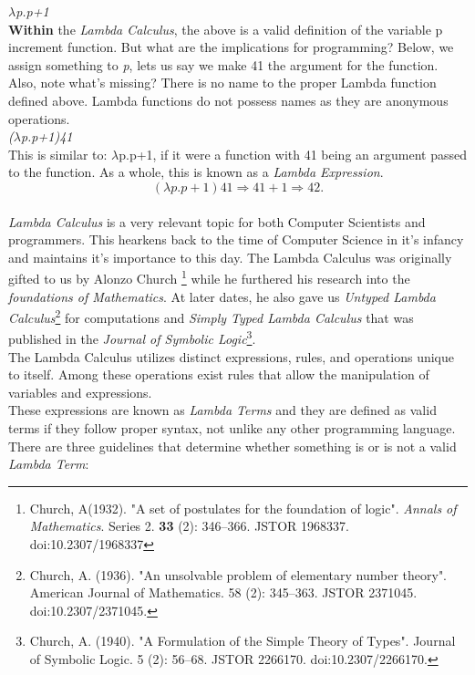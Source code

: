\documentclass[oneside,12pt]{memoir} %
\begin{document}
	
\emph{\ensuremath{\lambda}p.p+1}\\

\textbf{Within} the \emph{Lambda Calculus}, the above is a valid definition of the variable p increment function. But what are the implications for programming? Below, we assign something to \emph{p}, lets us say we make 41 the argument for the function. Also, note what's missing? There is no name to the proper Lambda function defined above. Lambda functions do not possess names as they are anonymous operations.\\


\emph{(\ensuremath{\lambda}p.p+1)41}\\

This is similar to: \ensuremath{\lambda}p.p+1, if it were a function with 41 being an argument passed to the function. As a whole, this is known as a \emph{Lambda Expression}.\\

\[(\lambda p.p+1)41 \Rightarrow 41+1 \Rightarrow 42.\]\\



\emph{Lambda Calculus} is a very relevant topic for both Computer Scientists and programmers. This hearkens back to the time of Computer Science in it's infancy and maintains it's importance to this day. The Lambda Calculus was originally gifted to us by Alonzo Church \footnote{Church, A(1932). "A set of postulates for the foundation of logic". \emph{Annals of Mathematics}. Series 2. \textbf{33} (2): 346–366. JSTOR 1968337. doi:10.2307/1968337} while he furthered his research into the \emph{foundations of Mathematics}. At later dates, he also gave us \emph{Untyped Lambda Calculus}\footnote{ Church, A. (1936). "An unsolvable problem of elementary number theory". American Journal of Mathematics. 58 (2): 345–363. JSTOR 2371045. doi:10.2307/2371045.} for computations and \emph{Simply Typed Lambda Calculus} that was published in the \emph{Journal of Symbolic Logic}\footnote{Church, A. (1940). "A Formulation of the Simple Theory of Types". Journal of Symbolic Logic. 5 (2): 56–68. JSTOR 2266170. doi:10.2307/2266170.}.\\

The Lambda Calculus utilizes distinct expressions, rules, and operations unique to itself. Among these operations exist rules that allow the manipulation of variables and expressions.\\

These expressions are known as \emph{Lambda Terms} and they are defined as valid terms if they follow proper syntax, not unlike any other programming language. \\
There are three guidelines that determine whether something is or is not a valid \emph{Lambda Term}:\\
\end{document}

